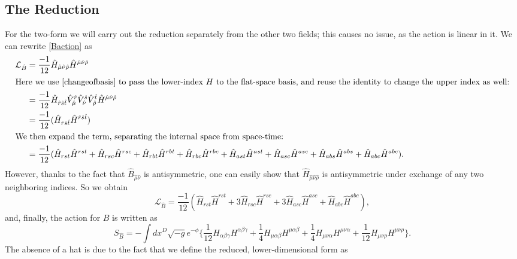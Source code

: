 \documentclass{article}
\begin{document}
\subsection{The Reduction}
For the two-form we will carry out the reduction separately from the other two fields; this causes no issue, as the action is linear in it.
We can rewrite \eqref{Baction} as
\begin{align*}
    \mathcal{L}_{\hat B} &= \frac{-1}{12} \hat H_{ \hat \mu \hat \nu \hat \rho} \hat H^{ \hat \mu \hat \nu \hat \rho}\\
    \intertext{Here we use \eqref{changeofbasis} to pass the lower-index $H$ to the flat-space basis, and reuse the identity to change the upper index as well:}
    &=\frac{-1}{12} \hat H_{ \hat r \hat s \hat t}  \hat V^{\hat r}_{\hat \mu} \hat V^{\hat s}_{\hat \nu} \hat V^{\hat t}_{\hat \rho} \hat H^{ \hat \mu \hat \nu \hat \rho}\\
    &=\frac{-1}{12}(\hat H_{ \hat r \hat s\hat t}\hat H^{ \hat r \hat s \hat t})\\
    \intertext{We then expand the term, separating the internal space from space-time:}
    &=\frac{-1}{12}(\hat H_{  r  s t}\hat H^{  r  s  t} + \hat H_{  r  s c}\hat H^{  r  s  c} + \hat H_{  r  b t}\hat H^{  r  b  t} + \hat H_{  r  b c}\hat H^{  r  b  c} + \hat H_{  a  s t}\hat H^{  a  s  t} + \hat H_{  a  s c}\hat H^{  a  s  c} + \hat H_{  a  b s}\hat H^{  a  b  s} + \hat H_{  a  b c}\hat H^{  a  b  c}).
\end{align*}
However, thanks to the fact that $\hat B_{\hat \mu \hat \nu}$ is antisymmetric, one can easily show that $\hat H_{ \hat \mu \hat \nu \hat \rho}$ is antisymmetric under exchange of any two neighboring indices. So we obtain
\begin{equation}
    \mathcal{L}_{\hat B} =\frac{-1}{12} (\hat H_{  r  s t}\hat H^{  r  s  t} + 3\hat H_{  r  s c}\hat H^{  r  s  c} + 3\hat H_{  a  s c}\hat H^{  a  s  c} + \hat H_{  a  b c}\hat H^{  a  b  c}),
\end{equation}
and, finally, the action for $B$ is written as
\begin{equation} \label{Bactionexpa}
    \boxed{S_{\hat B } = - \int dx^D\sqrt{-g}e^{-\phi} \Big\lbrace  \frac{1}{12} H_{  \alpha  \beta \gamma} H^{  \alpha \beta \gamma} + \frac{1}{4} H_{  \mu   \alpha \beta} H^{  \mu   \alpha  \beta} + \frac{1}{4} H_{  \mu \nu \alpha } H^{  \mu  \nu  \alpha} + \frac{1}{12} H_{  \mu  \nu \rho}H^{  \mu  \nu  \rho} \Big\rbrace. }
\end{equation}
The absence of a hat is due to the fact that we define the reduced, lower-dimensional form as
\end{document}
